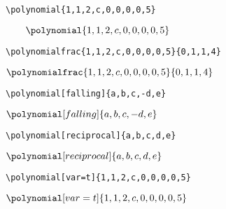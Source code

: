 \vspace{0cm}\begin{center}
\begin{minipage}[l]{.59\textwidth}
\begin{verbatim}
\polynomial{1,1,2,c,0,0,0,0,5}
\end{verbatim}
\end{minipage}
\begin{minipage}[r]{.39\textwidth}
$\qquad\polynomial{1,1,2,c,0,0,0,0,5}$
\end{minipage}\vspace{.5cm}

\begin{minipage}[l]{.62\textwidth}
\begin{verbatim}
\polynomialfrac{1,1,2,c,0,0,0,0,5}{0,1,1,4}
\end{verbatim}
\end{minipage}
\begin{minipage}[r]{.37\textwidth}
\qquad$\displaystyle\polynomialfrac{1,1,2,c,0,0,0,0,5}{0,1,1,4}$
\end{minipage}\vspace{.5cm}

\begin{minipage}[l]{.59\textwidth}
\begin{verbatim}	
\polynomial[falling]{a,b,c,-d,e}
\end{verbatim}
\end{minipage}
\begin{minipage}[r]{.39\textwidth}
$\polynomial[falling]{a,b,c,-d,e}$
\end{minipage}\vspace{.5cm}

\begin{minipage}[l]{.59\textwidth}
\begin{verbatim}
\polynomial[reciprocal]{a,b,c,d,e}
\end{verbatim}
\end{minipage}
\begin{minipage}[r]{.39\textwidth}
\qquad$\polynomial[reciprocal]{a,b,c,d,e}$
\end{minipage}\vspace{.5cm}

\begin{minipage}[l]{.59\textwidth}
\begin{verbatim}
\polynomial[var=t]{1,1,2,c,0,0,0,0,5}
\end{verbatim}
\end{minipage}
\begin{minipage}[r]{.39\textwidth}
\qquad$\polynomial[var=t]{1,1,2,c,0,0,0,0,5}$
\end{minipage}\vspace{.5cm}


\end{center}
